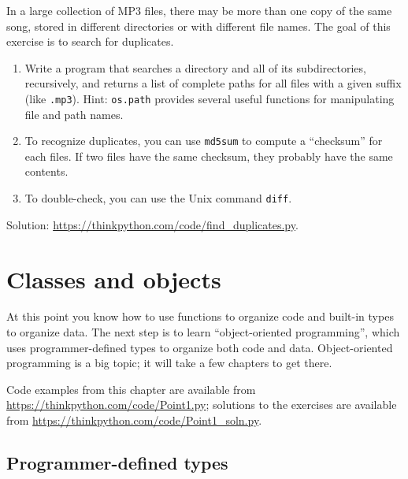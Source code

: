 \documentclass[10pt]{book}
\begin{document}
\begin{exercise}
\label{checksum}

In a large collection of MP3 files, there may be more than one
copy of the same song, stored in different directories or with
different file names.  The goal of this exercise is to search for
duplicates.

\begin{enumerate}

\item Write a program that searches a directory and all of its
subdirectories, recursively, and returns a list of complete paths
for all files with a given suffix (like {\tt .mp3}).
Hint: {\tt os.path} provides several useful functions for
manipulating file and path names.

\item To recognize duplicates, you can use {\tt md5sum}
to compute a ``checksum'' for each files.  If two files have
the same checksum, they probably have the same contents.

\item To double-check, you can use the Unix command {\tt diff}.

\end{enumerate}

Solution: \url{https://thinkpython.com/code/find_duplicates.py}.

\end{exercise}



\chapter{Classes and objects}
\label{clobjects}

At this point you know how to use
functions to organize code and
built-in types to organize data.  The next step is to learn
``object-oriented programming'', which uses programmer-defined types
to organize both code and data.  Object-oriented programming is
a big topic; it will take a few chapters to get there.

Code examples from this chapter are available from
\url{https://thinkpython.com/code/Point1.py}; solutions
to the exercises are available from
\url{https://thinkpython.com/code/Point1_soln.py}.


\section{Programmer-defined types}
\label{point}
\end{document}

